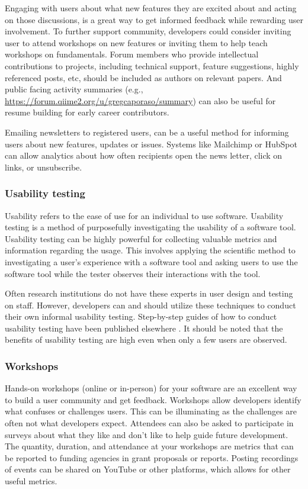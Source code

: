 Engaging with users about what new features they are excited about and acting on those discussions, is a great way to get informed feedback while rewarding user involvement. To further support community, developers could consider inviting user to attend workshops on new features or inviting them to help teach workshops on fundamentals.  Forum members who provide intellectual contributions to projects, including technical support, feature suggestions, highly referenced posts, etc, should be included as authors on relevant papers. And public facing activity summaries (e.g., \url{https://forum.qiime2.org/u/gregcaporaso/summary}) can also be useful for resume building for early career contributors.

Emailing newsletters to registered users, can be a useful method for informing users about new features, updates or issues. Systems like Mailchimp \cite{mailchimp} or HubSpot \cite{hubspot} can allow analytics about how often recipients open the news letter, click on links, or unsubscribe.

\subsubsection{Usability testing}

Usability refers to the ease of use for an individual to use software. Usability testing is a method of purposefully investigating the usability of a software tool. Usability testing can be highly powerful for collecting valuable metrics and information regarding the usage. This involves applying the scientific method to investigating a user's experience with a software tool and asking users to use the software tool while the tester observes their interactions with the tool. 

Often research institutions do not have these experts in user design and testing on staff. However, developers can and should utilize these techniques to conduct their own informal usability testing. Step-by-step guides of how to conduct usability testing have been published elsewhere \cite{savonen_2021}.  It should be noted that the benefits of usability testing are high even when only a few users are observed. 

\subsubsection{Workshops}
Hands-on workshops (online\cite{dillon_experiences_2021} or in-person) for your software are an excellent way to build a user community and get feedback. Workshops allow developers identify what confuses or challenges users. This can be illuminating as the challenges are often not what developers expect. Attendees can also be asked to participate in surveys about what they like and don't like to help guide future development. The quantity, duration, and attendance at your workshops are metrics that can be reported to funding agencies in grant proposals or reports. Posting recordings of events can be shared on YouTube or other platforms, which allows for other useful metrics. 


